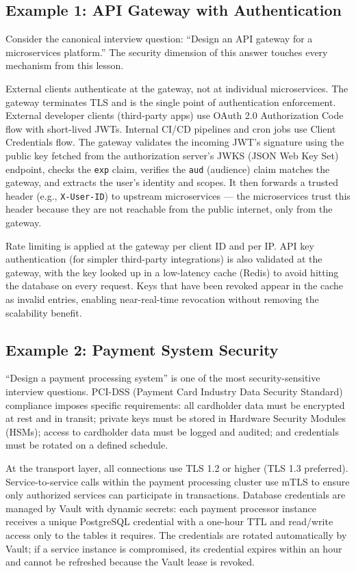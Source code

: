 \documentclass[11pt,a4paper]{article}
\begin{document}
\subsection{Example 1: API Gateway with Authentication}

Consider the canonical interview question: ``Design an API gateway for a microservices platform.'' The security dimension of this answer touches every mechanism from this lesson.

External clients authenticate at the gateway, not at individual microservices. The gateway terminates TLS and is the single point of authentication enforcement. External developer clients (third-party apps) use OAuth 2.0 Authorization Code flow with short-lived JWTs. Internal CI/CD pipelines and cron jobs use Client Credentials flow. The gateway validates the incoming JWT's signature using the public key fetched from the authorization server's JWKS (JSON Web Key Set) endpoint, checks the \texttt{exp} claim, verifies the \texttt{aud} (audience) claim matches the gateway, and extracts the user's identity and scopes. It then forwards a trusted header (e.g., \texttt{X-User-ID}) to upstream microservices --- the microservices trust this header because they are not reachable from the public internet, only from the gateway.

Rate limiting is applied at the gateway per client ID and per IP. API key authentication (for simpler third-party integrations) is also validated at the gateway, with the key looked up in a low-latency cache (Redis) to avoid hitting the database on every request. Keys that have been revoked appear in the cache as invalid entries, enabling near-real-time revocation without removing the scalability benefit.

\subsection{Example 2: Payment System Security}

``Design a payment processing system'' is one of the most security-sensitive interview questions. PCI-DSS (Payment Card Industry Data Security Standard) compliance imposes specific requirements: all cardholder data must be encrypted at rest and in transit; private keys must be stored in Hardware Security Modules (HSMs); access to cardholder data must be logged and audited; and credentials must be rotated on a defined schedule.

At the transport layer, all connections use TLS 1.2 or higher (TLS 1.3 preferred). Service-to-service calls within the payment processing cluster use mTLS to ensure only authorized services can participate in transactions. Database credentials are managed by Vault with dynamic secrets: each payment processor instance receives a unique PostgreSQL credential with a one-hour TTL and read/write access only to the tables it requires. The credentials are rotated automatically by Vault; if a service instance is compromised, its credential expires within an hour and cannot be refreshed because the Vault lease is revoked.
\end{document}
